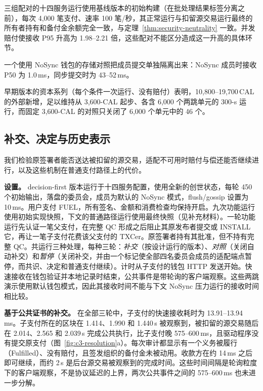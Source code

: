 三组配对的十四服务运行使用基线版本的初始构建（在批处理结果标签分离之前），每次 4,000 笔支付、速率 100 笔/秒，其正常运行与扣留源交易运行最终的所有者持有和备付金余额完全一致，与定理~\ref{thm:security-neutrality} 一致。并发赔付使接收 P95 升高为 1.98--2.21 倍，这些配对不能区分造成这一升高的具体环节。

一个使用 NoSync 钱包的存储对照把成员提交单独隔离出来：NoSync 成员时接收 P50 为 1.0\,ms，同步提交时为 43--52\,ms。

早期版本的资本系列（每个条件一次运行、没有赔付）表明，10,800--19,700\,CAL 的外部新增，足以维持从 3,600-CAL 起步、各含 6,000 个两跳单元的 300-s 运行，而固定 3,600-CAL 的对照只关闭了 6,000 个单元中的 46 个。

\subsection{补交、决定与历史表示}
\label{sec:eval-repair}

我们检验原签署者能否送达被扣留的源交易，适配不可用时赔付与偿还能否继续进行，以及这些机制在普通支付路径上的代价。

\noindent\textbf{设置。}
decision-first 版本运行于十四服务配置，使用全新的创世状态，每轮 450 个初始输出，落盘的委员会，成员为默认的 NoSync 模式，flush/gossip 设置为 10\,ms。用户支付 FUEL，所有签名、金额和消费检查均保持开启。九次功能运行使用初始实现快照，下文的普通路径运行使用最终快照（见补充材料）。一轮功能运行先认证一笔父支付，在完整 QC 形成之后阻止其原发布者提交或 INSTALL 它，再让一笔子支付花费该父支付的 TXCer。原签署者持有其批准，但不持有完整 QC。共运行三种处理，每种三轮：\emph{补交}（按设计运行的版本）、\emph{对照}（关闭自动补交）和\emph{暂停}（关闭补交，并由一个标记使全部四名委员会成员的适配端点暂停，而共识、决定和普通支付继续）。计时从子支付的钱包 HTTP 发送开始。快速接收在钱包验证并本地记录时结束，公共事件是带轮询的客户端观察。这些两跳演示使用默认钱包模式，因此其接收时间不能与下文 NoSync 压力运行的接收时间相比较。

\noindent\textbf{基于公共证书的补交。}
在全部三轮中，子支付的快速接收耗时为 13.91--13.94\,ms。子支付所在的区块在 1.414、1.990 和 1.440\,s 被观察到，被扣留的源交易随后在 2.014、2.565 和 2.039\,s 完成公共执行，比子支付晚 575--600\,ms，且驱动程序没有提交原支付（图~\ref{fig:c3-resolution}a）。每次审计都显示有一个义务被履行（Fulfilled）、没有赔付，且签发组织的备付金未被动用。收款方在约 14\,ms 之后即可继续，而约 2\,s 是后台源交易被观察到的完成时间。这些时间间隔是轮询粒度下的客户端观察，不是协议延迟的上界，两次公共事件之间的 575--600\,ms 也未进一步分解。

